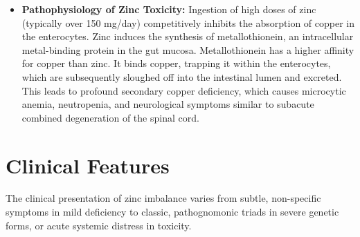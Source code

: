 \begin{itemize}
    \item \textbf{Pathophysiology of Zinc Toxicity:} Ingestion of high doses of zinc (typically over 150 mg/day) competitively inhibits the absorption of copper in the enterocytes. Zinc induces the synthesis of metallothionein, an intracellular metal-binding protein in the gut mucosa. Metallothionein has a higher affinity for copper than zinc. It binds copper, trapping it within the enterocytes, which are subsequently sloughed off into the intestinal lumen and excreted. This leads to profound secondary copper deficiency, which causes microcytic anemia, neutropenia, and neurological symptoms similar to subacute combined degeneration of the spinal cord.
\end{itemize}

\section*{Clinical Features}
The clinical presentation of zinc imbalance varies from subtle, non-specific symptoms in mild deficiency to classic, pathognomonic triads in severe genetic forms, or acute systemic distress in toxicity.

